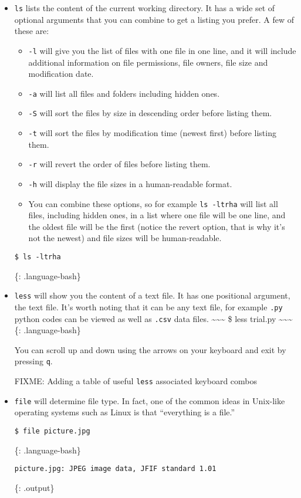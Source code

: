 \documentclass[
]{book}
\providecommand{\tightlist}{%
  \setlength{\itemsep}{0pt}\setlength{\parskip}{0pt}}
\begin{document}
\begin{itemize}
\item
  \texttt{ls} lists the content of the current working directory. It has a wide set of optional arguments that you can combine to get a listing you prefer. A few of these are:

  \begin{itemize}
  \tightlist
  \item
    \texttt{-l} will give you the list of files with one file in one line, and it will include additional information on file permissions, file owners, file size and modification date.
  \item
    \texttt{-a} will list all files and folders including hidden ones.
  \item
    \texttt{-S} will sort the files by size in descending order before listing them.
  \item
    \texttt{-t} will sort the files by modification time (newest first) before listing them.
  \item
    \texttt{-r} will revert the order of files before listing them.
  \item
    \texttt{-h} will display the file sizes in a human-readable format.
  \item
    You can combine these options, so for example \texttt{ls\ -ltrha} will list all files, including hidden ones, in a list where one file will be one line, and the oldest file will be the first (notice the revert option, that is why it's not the newest) and file sizes will be human-readable.
  \end{itemize}

\begin{verbatim}
$ ls -ltrha  
\end{verbatim}

  \{: .language-bash\}
\item
  \texttt{less} will show you the content of a text file. It has one positional argument, the text file. It's worth noting that it can be any text file, for example \texttt{.py} python codes can be viewed as well as \texttt{.csv} data files.
  \textasciitilde\textasciitilde\textasciitilde{}
  \$ less trial.py
  \textasciitilde\textasciitilde\textasciitilde{}
  \{: .language-bash\}

  You can scroll up and down using the arrows on your keyboard and exit by pressing \texttt{q}.

  FIXME: Adding a table of useful \texttt{less} associated keyboard combos
\item
  \texttt{file} will determine file type. In fact, one of the common ideas in Unix-like operating systems such as Linux is that ``everything is a file.''

\begin{verbatim}
$ file picture.jpg 
\end{verbatim}

  \{: .language-bash\}

\begin{verbatim}
picture.jpg: JPEG image data, JFIF standard 1.01  
\end{verbatim}

  \{: .output\}
\end{itemize}
\end{document}
